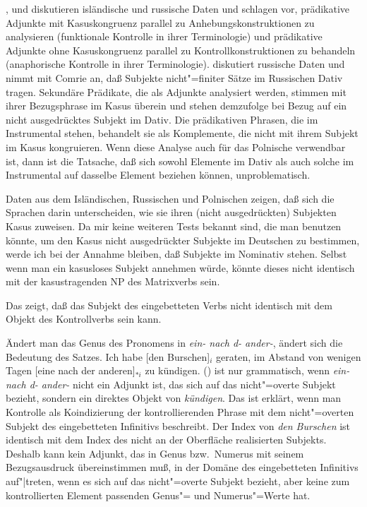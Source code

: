 {%
% 
        \citet{Andrews82b}, \citet{Neidle82a} und 
        \citet[]{Bresnan82c} diskutieren isländische und
        russische Daten und schlagen vor, prädikative Adjunkte mit Kasuskongruenz
        parallel zu Anhebungskonstruktionen zu analysieren (funktionale Kontrolle
        in ihrer Terminologie) und prädikative Adjunkte ohne Kasuskongruenz parallel zu
        Kontrollkonstruktionen zu behandeln (anaphorische Kontrolle
        in ihrer Terminologie).
        \citet[]{Neidle82a} diskutiert russische Daten und nimmt mit Comrie
        an, daß Subjekte nicht"=finiter Sätze im Russischen Dativ tragen. Sekundäre Prädikate,
        die als Adjunkte analysiert werden, stimmen mit ihrer Bezugsphrase im Kasus überein und
        stehen demzufolge bei Bezug auf ein nicht ausgedrücktes Subjekt im Dativ. Die prädikativen
        Phrasen, die im Instrumental stehen, behandelt sie als Komplemente, die nicht mit
        ihrem Subjekt im Kasus kongruieren. Wenn diese Analyse auch für das Polnische verwendbar
        ist, dann ist die Tatsache, daß sich sowohl Elemente im Dativ als auch solche im Instrumental
        auf dasselbe Element beziehen können, unproblematisch.

        Daten aus dem Isländischen, Russischen und Polnischen zeigen, daß sich die Sprachen darin unterscheiden, wie sie
        ihren (nicht ausgedrückten) Subjekten Kasus zuweisen. Da mir keine weiteren
        Tests bekannt sind, die man benutzen könnte, um den Kasus nicht ausgedrückter Subjekte
        im Deutschen zu bestimmen, werde ich bei der Annahme bleiben, daß Subjekte im Nominativ
        stehen.
        Selbst wenn man ein kasusloses Subjekt annehmen würde, könnte dieses nicht identisch
        mit der kasustragenden NP des Matrixverbs sein.
}
Das zeigt, daß das Subjekt des eingebetteten Verbs nicht identisch mit dem Objekt des Kontrollverbs
sein kann.

Ändert man das Genus des Pronomens in {\em ein- nach d- ander-\/}, ändert sich die Bedeutung des Satzes.
\ea
Ich habe [den Burschen]$_i$ geraten, im Abstand von wenigen Tagen [eine nach der an\-de\-ren]$_{*i}$ zu kündigen.
\z
() ist nur grammatisch, wenn {\em ein- nach d- ander-\/} nicht ein Adjunkt ist, das 
sich auf das nicht"=overte Subjekt bezieht, sondern ein direktes Objekt von \emph{kündigen}.
Das ist erklärt, wenn man Kontrolle als Koindizierung der kontrollierenden Phrase mit dem nicht"=overten
Subjekt des eingebetteten Infinitivs beschreibt. Der Index von \emph{den Burschen} ist identisch
mit dem Index des nicht an der Oberfläche realisierten Subjekts. Deshalb kann kein Adjunkt,
das
in Genus bzw.\ Numerus mit seinem Bezugsausdruck übereinstimmen muß, in der Domäne
des eingebetteten Infinitivs auf"|treten, wenn es sich auf das nicht"=overte Subjekt bezieht,
aber keine zum kontrollierten Element passenden Genus"= und Numerus"=Werte hat.%

